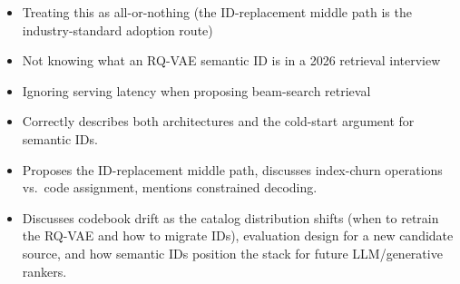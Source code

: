 \begin{interviewq}
\redflags
\begin{itemize}
    \item Treating this as all-or-nothing (the ID-replacement middle path is the industry-standard adoption route)
    \item Not knowing what an RQ-VAE semantic ID is in a 2026 retrieval interview
    \item Ignoring serving latency when proposing beam-search retrieval
\end{itemize}


\goodgreat
\begin{itemize}
    \item {} Correctly describes both architectures and the cold-start argument for semantic IDs.
    \item {} Proposes the ID-replacement middle path, discusses index-churn operations vs.\ code assignment, mentions constrained decoding.
    \item {} Discusses codebook drift as the catalog distribution shifts (when to retrain the RQ-VAE and how to migrate IDs), evaluation design for a new candidate source, and how semantic IDs position the stack for future LLM/generative rankers.
\end{itemize}

\end{interviewq}

